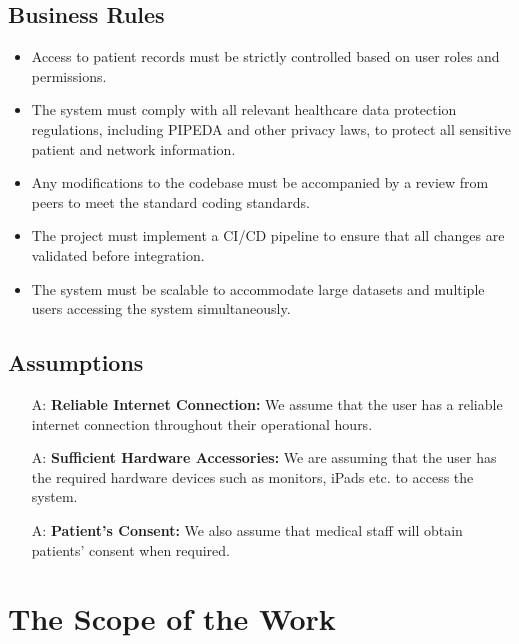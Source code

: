 \documentclass[12pt]{article}
\newcounter{assumpnum} %
\begin{document}
\subsection{Business Rules}
\begin{itemize}
  \item Access to patient records must be strictly controlled based on user roles and permissions.
  
  \item The system must comply with all relevant healthcare data protection regulations, including PIPEDA and other privacy laws, to protect all sensitive patient and network information.
  
  \item Any modifications to the codebase must be accompanied by a review from peers to meet the standard coding standards.
  
  \item The project must implement a CI/CD pipeline to ensure that all changes are validated before integration.

  \item The system must be scalable to accommodate large datasets and multiple users accessing the system simultaneously.

\end{itemize}

\subsection{Assumptions}

\begin{itemize}
  \item[A\refstepcounter{assumpnum}\theassumpnum \label{A_reliableInternet}:] \textbf{Reliable Internet Connection:} We assume that the user has a reliable internet connection throughout their operational hours.
  \item[A\refstepcounter{assumpnum}\theassumpnum \label{A_sufficientHardware}:] \textbf{Sufficient Hardware Accessories:} We are assuming that the user has the required hardware devices such as monitors, iPads etc. to access the system.
  \item[A\refstepcounter{assumpnum}\theassumpnum \label{A_patientConsent}:] \textbf{Patient's Consent:} We also assume that medical staff will obtain patients' consent when required.  
\end{itemize}


\section{The Scope of the Work}
\end{document}
